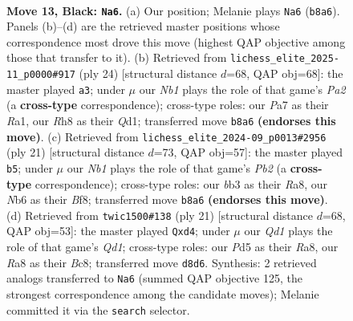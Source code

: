 \documentclass[11pt]{article}
\begin{document}
\clearpage

\begin{figure}[p]\centering
\begin{subfigure}{0.46\textwidth}\centering
\resizebox{\linewidth}{!}{%
\newchessgame
\chessboard[
  setfen={rnbqk2r/ppp1b3/1n3pp1/3p3p/P2P4/NB5N/1PP2PPP/R1BQR1K1 b kq - 3 13},
  showmover=false,
  pgfstyle=straightmove, color=movearrow, markmove={b8-a6}
]}
\caption{}
\end{subfigure}\hfill
\begin{subfigure}{0.46\textwidth}\centering
\resizebox{\linewidth}{!}{%
\newchessgame
\chessboard[
  setfen={r1bq1rk1/ppp2pp1/n3pn1p/1N1P4/1bP4B/3B1N2/PP3PPP/R2Q1K1R w - - 2 13},
  showmover=false,
  pgfstyle=straightmove, color=movearrow, markmove={a2-a3}
]}
\caption{}
\end{subfigure}
\\[4pt]
\begin{subfigure}{0.46\textwidth}\centering
\resizebox{\linewidth}{!}{%
\newchessgame
\chessboard[
  setfen={r2qkb1r/1pp3pp/p1n2n2/3p1b2/B2P4/2P2N2/PP4PP/RNBQ1RK1 b kq - 0 11},
  showmover=false,
  pgfstyle=straightmove, color=movearrow, markmove={b7-b5}
]}
\caption{}
\end{subfigure}\hfill
\begin{subfigure}{0.46\textwidth}\centering
\resizebox{\linewidth}{!}{%
\newchessgame
\chessboard[
  setfen={r1bqk2r/1pp1b1pp/1n3p2/p3p3/P2N4/1B6/1PP2PPP/RNBQR1K1 b kq - 0 11},
  showmover=false,
  pgfstyle=straightmove, color=movearrow, markmove={d8-d4}
]}
\caption{}
\end{subfigure}
\caption{\textbf{Move 13, Black: \texttt{Na6}.} (a) Our position; Melanie plays \texttt{Na6} (\texttt{b8a6}). Panels (b)--(d) are the retrieved master positions whose correspondence most drove this move (highest QAP objective among those that transfer to it). (b) Retrieved from \texttt{lichess\_elite\_2025-11\_p0000\#917} (ply 24) [structural distance $d$=68, QAP obj=68]: the master played \texttt{a3}; under $\mu$ our \emph{Nb1} plays the role of that game's \emph{Pa2} (a \textbf{cross-type} correspondence); cross-type roles: our \emph{P}a7 as their \emph{R}a1, our \emph{R}h8 as their \emph{Q}d1; transferred move \texttt{b8a6} \textbf{(endorses this move)}. (c) Retrieved from \texttt{lichess\_elite\_2024-09\_p0013\#2956} (ply 21) [structural distance $d$=73, QAP obj=57]: the master played \texttt{b5}; under $\mu$ our \emph{Nb1} plays the role of that game's \emph{Pb2} (a \textbf{cross-type} correspondence); cross-type roles: our \emph{b}b3 as their \emph{R}a8, our \emph{N}b6 as their \emph{B}f8; transferred move \texttt{b8a6} \textbf{(endorses this move)}. (d) Retrieved from \texttt{twic1500\#138} (ply 21) [structural distance $d$=68, QAP obj=53]: the master played \texttt{Qxd4}; under $\mu$ our \emph{Qd1} plays the role of that game's \emph{Qd1}; cross-type roles: our \emph{P}d5 as their \emph{R}a8, our \emph{R}a8 as their \emph{B}c8; transferred move \texttt{d8d6}. Synthesis: 2 retrieved analogs transferred to \texttt{Na6} (summed QAP objective 125, the strongest correspondence among the candidate moves); Melanie committed it via the \texttt{search} selector.}
\label{fig:thought-m25}
\end{figure}
\end{document}
